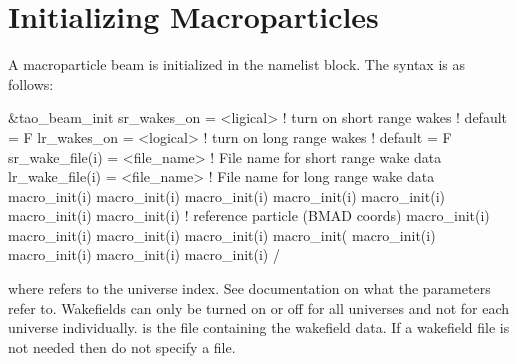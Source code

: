 \section{Initializing Macroparticles}
\label{s:macros}

A macroparticle beam is initialized in the  namelist block.
The syntax is as follows:
\begin{example}
  \&tao_beam_init
    sr_wakes_on             = <ligical>   ! turn on short range wakes
                                          ! default = F
    lr_wakes_on             = <logical>   ! turn on long range wakes
                                          ! default = F
    sr_wake_file(i)         = <file_name> ! File name for short range wake data
    lr_wake_file(i)         = <file_name> ! File name for long range wake data
    macro_init(i)%
    macro_init(i)%
    macro_init(i)%
    macro_init(i)%
    macro_init(i)%
    macro_init(i)%
    macro_init(i)%
                                         ! reference particle (BMAD coords)
    macro_init(i)%
    macro_init(i)%
    macro_init(i)%
    macro_init(i)%
    macro_init(
    macro_init(i)%
    macro_init(i)%
    macro_init(i)%
    macro_init(i)%
  /
\end{example}
where  refers to the universe index. See \bmad documentation on what the
 parameters refer to. Wakefields can only be turned on or off for all
universes and not for each universe individually.  is the file containing the
wakefield data. If a wakefield file is not needed then do not specify a file.

